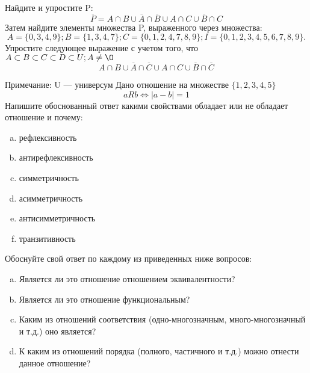 \documentclass[10pt]{exam}
\begin{document}
\begin{questions}
\question
Найдите и упростите P:
\begin{equation*}
\overline{P} = A \cap B \cup \overline{A} \cap \overline{B} \cup A \cap C \cup \overline{B} \cap C
\end{equation*}
Затем найдите элементы множества P, выраженного через множества:
\begin{equation*}
A = \{0, 3, 4, 9\}; 
B = \{1, 3, 4, 7\};
C = \{0, 1, 2, 4, 7, 8, 9\};
I = \{0, 1, 2, 3, 4, 5, 6, 7, 8, 9\}.
\end{equation*}\question
Упростите следующее выражение с учетом того, что $A\subset B \subset C \subset D \subset U; A \neq \O$
\begin{equation*}
A \cap B \cup \overline{A} \cap \overline{C} \cup A \cap C \cup \overline{B} \cap \overline{C}
\end{equation*}

Примечание: U — универсум\question
Дано отношение на множестве $\{1, 2, 3, 4, 5\}$ 
\begin{equation*}
aRb \iff |a-b| = 1
\end{equation*}
Напишите обоснованный ответ какими свойствами обладает или не обладает отношение и почему:   
\begin{enumerate} [a)]\setcounter{enumi}{0}
\item рефлексивность
\item антирефлексивность
\item симметричность
\item асимметричность
\item антисимметричность
\item транзитивность
\end{enumerate}

Обоснуйте свой ответ по каждому из приведенных ниже вопросов:
\begin{enumerate} [a)]\setcounter{enumi}{0}
    \item Является ли это отношение отношением эквивалентности?
    \item Является ли это отношение функциональным?
    \item Каким из отношений соответствия (одно-многозначным, много-многозначный и т.д.) оно является?
    \item К каким из отношений порядка (полного, частичного и т.д.) можно отнести данное отношение?
\end{enumerate}


\end{questions}
\end{document}
